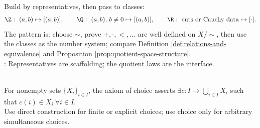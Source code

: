 \begin{perspective} \label{per:number-systems-from-representatives} \\
Build by representatives, then pass to classes:
\begin{align}
\Z:\ (a,b)\mapsto[(a,b)],\qquad
\Q:\ (a,b),\,b\neq0\mapsto[(a,b)],\qquad
\R:\ \text{cuts or Cauchy data}\mapsto[\cdot]. \nonumber
\end{align}
The pattern is: choose $\sim$, prove $+,\cdot,<,\ldots$ are well defined on $X/{\sim}$, then use the classes as the number system; compare Definition \ref{def:relations-and-equivalence} and Proposition \ref{prop:quotient-space-structure}.\\
: Representatives are scaffolding; the quotient laws are the interface.
\end{perspective}

\begin{principle} \label{princ:axiom-of-choice-analysis} \\
For nonempty sets $\{X_i\}_{i\in I}$, the axiom of choice asserts $\exists c:I\to\bigcup\limits_{i\in I}X_i$ such that $c(i)\in X_i\ \forall i\in I$.\\
Use direct construction for finite or explicit choices; use choice only for arbitrary simultaneous choices.
\end{principle}

